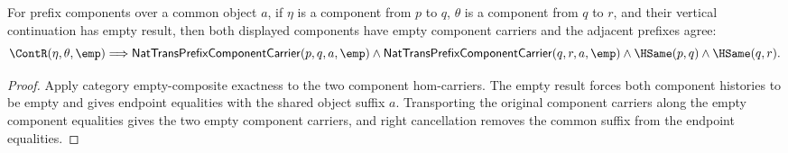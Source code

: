 \begin{theorem}
\label{thm:nattrans-prefix-component-vertical-empty-component-readback}
For prefix components over a common object $a$, if $\eta$ is a component from
$p$ to $q$, $\theta$ is a component from $q$ to $r$, and their vertical
continuation has empty result, then both displayed components have empty
component carriers and the adjacent prefixes agree:
$$
\ContR(\eta,\theta,\emp)
\Longrightarrow
\mathsf{NatTransPrefixComponentCarrier}(p,q,a,\emp)
\land
\mathsf{NatTransPrefixComponentCarrier}(q,r,a,\emp)
\land
\HSame(p,q)
\land
\HSame(q,r).
$$
\end{theorem}
\begin{proof}
Apply category empty-composite exactness to the two component hom-carriers.
The empty result forces both component histories to be empty and gives endpoint
equalities with the shared object suffix $a$. Transporting the original
component carriers along the empty component equalities gives the two empty
component carriers, and right cancellation removes the common suffix from the
endpoint equalities.
\end{proof}
